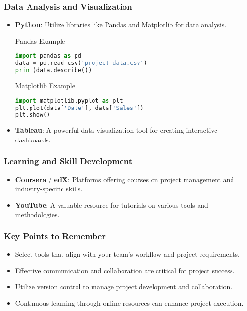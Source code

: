 \documentclass[aspectratio=169]{beamer}
\begin{document}
\begin{frame}[fragile]
    \frametitle{Data Analysis and Visualization}
    \begin{itemize}
        \item \textbf{Python}: Utilize libraries like Pandas and Matplotlib for data analysis.
        \begin{block}{Pandas Example}
            \begin{lstlisting}[language=python]
import pandas as pd
data = pd.read_csv('project_data.csv')
print(data.describe())
            \end{lstlisting}
        \end{block}
        \begin{block}{Matplotlib Example}
            \begin{lstlisting}[language=python]
import matplotlib.pyplot as plt
plt.plot(data['Date'], data['Sales'])
plt.show()
            \end{lstlisting}
        \end{block}

        \item \textbf{Tableau}: A powerful data visualization tool for creating interactive dashboards.
    \end{itemize}
\end{frame}

\begin{frame}
    \frametitle{Learning and Skill Development}
    \begin{itemize}
        \item \textbf{Coursera} / \textbf{edX}: Platforms offering courses on project management and industry-specific skills.
        
        \item \textbf{YouTube}: A valuable resource for tutorials on various tools and methodologies.
    \end{itemize}
\end{frame}

\begin{frame}
    \frametitle{Key Points to Remember}
    \begin{itemize}
        \item Select tools that align with your team's workflow and project requirements.
        \item Effective communication and collaboration are critical for project success.
        \item Utilize version control to manage project development and collaboration.
        \item Continuous learning through online resources can enhance project execution.
    \end{itemize}
\end{frame}
\end{document}
